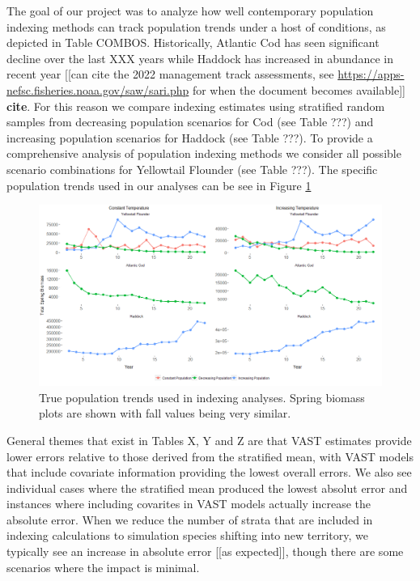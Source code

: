 \documentclass[
  12pt,
]{article}
\begin{document}
The goal of our project was to analyze how well contemporary population indexing methods can track population trends under a host of conditions, as depicted in Table COMBOS. Historically, Atlantic Cod has seen significant decline over the last XXX years while Haddock has increased in abundance in recent year {[}{[}can cite the 2022 management track assessments, see \url{https://apps-nefsc.fisheries.noaa.gov/saw/sari.php} for when the document becomes available{]}{]} \textbf{cite}. For this reason we compare indexing estimates using stratified random samples from decreasing population scenarios for Cod (see Table ???) and increasing population scenarios for Haddock (see Table ???). To provide a comprehensive analysis of population indexing methods we consider all possible scenario combinations for Yellowtail Flounder (see Table ???). The specific population trends used in our analyses can be see in Figure \ref{fig:pop-scenarios}

\begin{figure}

{\centering \includegraphics[width=0.99\linewidth]{Images/Population_scenarios} 

}

\caption{True population trends used in indexing analyses. Spring biomass plots are shown with fall values being very similar.}\label{fig:pop-scenarios}
\end{figure}

General themes that exist in Tables X, Y and Z are that VAST estimates provide lower errors relative to those derived from the stratified mean, with VAST models that include covariate information providing the lowest overall errors. We also see individual cases where the stratified mean produced the lowest absolut error and instances where including covarites in VAST models actually increase the absolute error. When we reduce the number of strata that are included in indexing calculations to simulation species shifting into new territory, we typically see an increase in absolute error {[}{[}as expected{]}{]}, though there are some scenarios where the impact is minimal.
\end{document}
